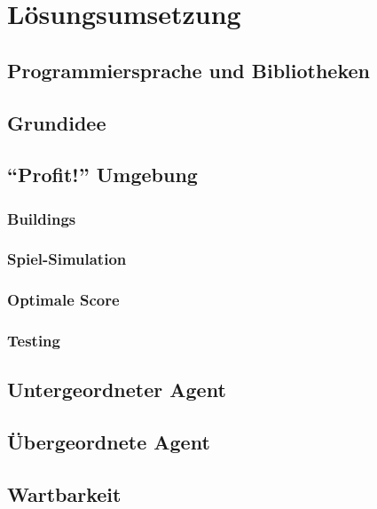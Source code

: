 \section{Lösungsumsetzung}

\subsection{Programmiersprache und Bibliotheken}
\subsection{Grundidee}
\subsection{“Profit!” Umgebung}
\subsubsection{Buildings}
\subsubsection{Spiel-Simulation}
\subsubsection{Optimale Score}
\subsubsection{Testing}

\subsection{Untergeordneter Agent}
\subsection{Übergeordnete Agent}
\subsection{Wartbarkeit}
